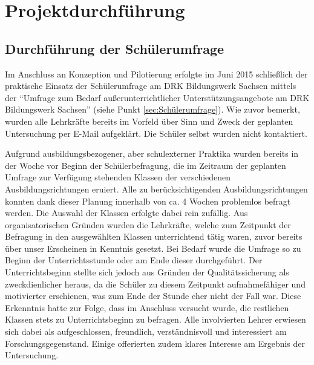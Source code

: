 \section{Projektdurchführung}
\label{sec:Projektdurchführung}

\subsection{Durchführung der Schülerumfrage}
\label{sec:DurchführungDerSchülerumfrage}

Im Anschluss an Konzeption und Pilotierung erfolgte im Juni 2015 schließlich der praktische Einsatz der Schülerumfrage am DRK Bildungswerk Sachsen mittels der "`Umfrage zum Bedarf außerunterrichtlicher Unterstützungsangebote am DRK Bildungswerk Sachsen"' (siehe Punkt \ref{sec:Schülerumfrage}). Wie zuvor bemerkt, wurden alle Lehrkräfte bereits im Vorfeld über Sinn und Zweck der geplanten Untersuchung per E-Mail aufgeklärt. Die Schüler selbst wurden nicht kontaktiert. 

Aufgrund ausbildungsbezogener, aber schulexterner Praktika wurden bereits in der Woche vor Beginn der Schülerbefragung, die im Zeitraum der geplanten Umfrage zur Verfügung stehenden Klassen der verschiedenen Ausbildungsrichtungen eruiert. Alle zu berücksichtigenden Ausbildungsrichtungen konnten dank dieser Planung innerhalb von ca. 4 Wochen problemlos befragt werden. Die Auswahl der Klassen erfolgte dabei rein zufällig. Aus organisatorischen Gründen wurden die Lehrkräfte, welche zum Zeitpunkt der Befragung in den ausgewählten Klassen unterrichtend tätig waren, zuvor bereits über unser Erscheinen in Kenntnis gesetzt. Bei Bedarf wurde die Umfrage so zu Beginn der Unterrichtsstunde oder am Ende dieser durchgeführt. Der Unterrichtsbeginn stellte sich jedoch aus Gründen der Qualitätssicherung als zweckdienlicher heraus, da die Schüler zu diesem Zeitpunkt aufnahmefähiger und motivierter erschienen, was zum Ende der Stunde eher nicht der Fall war. Diese Erkenntnis hatte zur Folge, dass im Anschluss versucht wurde, die restlichen Klassen stets zu Unterrichtsbeginn zu befragen. Alle involvierten Lehrer erwiesen sich dabei als aufgeschlossen, freundlich, verständnisvoll und interessiert am Forschungsgegenstand.  Einige offerierten zudem klares Interesse am Ergebnis der Untersuchung. 

